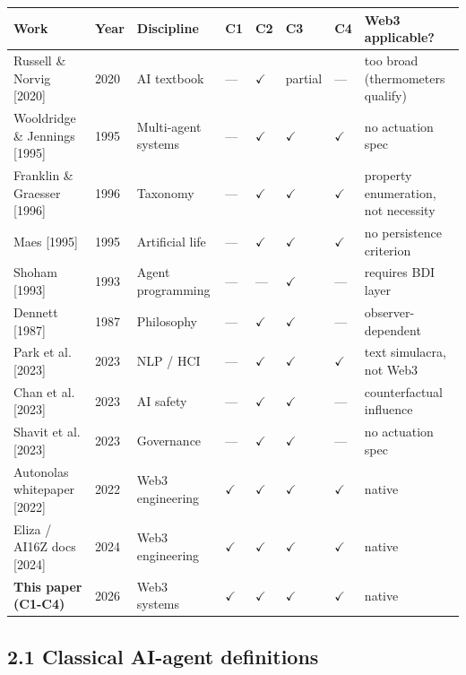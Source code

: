 \documentclass[sigconf,nonacm=false]{acmart}
\begin{document}
\begin{table}[h]
\centering
\small
\begin{tabular}{llllllll}
\toprule
Work & Year & Discipline & C1 & C2 & C3 & C4 & Web3 applicable? \\
\midrule
Russell \& Norvig [2020] & 2020 & AI textbook & --- & $\checkmark$ & partial & --- & too broad (thermometers qualify) \\
Wooldridge \& Jennings [1995] & 1995 & Multi-agent systems & --- & $\checkmark$ & $\checkmark$ & $\checkmark$ & no actuation spec \\
Franklin \& Graesser [1996] & 1996 & Taxonomy & --- & $\checkmark$ & $\checkmark$ & $\checkmark$ & property enumeration, not necessity \\
Maes [1995] & 1995 & Artificial life & --- & $\checkmark$ & $\checkmark$ & $\checkmark$ & no persistence criterion \\
Shoham [1993] & 1993 & Agent programming & --- & --- & $\checkmark$ & --- & requires BDI layer \\
Dennett [1987] & 1987 & Philosophy & --- & $\checkmark$ & $\checkmark$ & --- & observer-dependent \\
Park et al. [2023] & 2023 & NLP / HCI & --- & $\checkmark$ & $\checkmark$ & $\checkmark$ & text simulacra, not Web3 \\
Chan et al. [2023] & 2023 & AI safety & --- & $\checkmark$ & $\checkmark$ & --- & counterfactual influence \\
Shavit et al. [2023] & 2023 & Governance & --- & $\checkmark$ & $\checkmark$ & --- & no actuation spec \\
Autonolas whitepaper [2022] & 2022 & Web3 engineering & $\checkmark$ & $\checkmark$ & $\checkmark$ & $\checkmark$ & native \\
Eliza / AI16Z docs [2024] & 2024 & Web3 engineering & $\checkmark$ & $\checkmark$ & $\checkmark$ & $\checkmark$ & native \\
\textbf{This paper (C1-C4)} & 2026 & Web3 systems & $\checkmark$ & $\checkmark$ & $\checkmark$ & $\checkmark$ & native \\
\bottomrule
\end{tabular}
\end{table}

\subsection{2.1 Classical AI-agent definitions}
\end{document}
